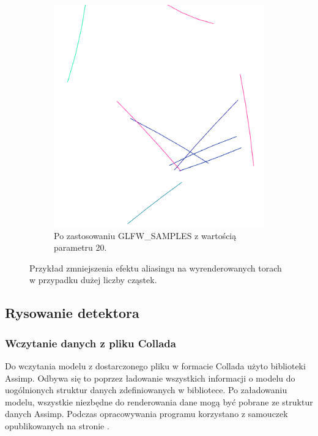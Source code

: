 \begin{figure}[H]
\begin{subfigure}{0.5\textwidth}
		\includegraphics[width=\textwidth]{Wart20.png}
    	\caption{Po zastosowaniu GLFW\_SAMPLES z wartością parametru 20.}
		\label{rys16}
	\end{subfigure}
    \caption{Przykład zmniejszenia efektu aliasingu na wyrenderowanych torach w przypadku dużej liczby cząstek.}
    \label{rys17}
\end{figure}


\newpage
\subsection{Rysowanie detektora}
\subsubsection{Wczytanie danych z pliku Collada}
Do wczytania modelu z dostarczonego pliku w formacie Collada użyto biblioteki Assimp. Odbywa się to poprzez ładowanie wszystkich informacji o modelu do uogólnionych struktur danych zdefiniowanych w bibliotece. Po załadowaniu modelu, wszystkie niezbędne do renderowania dane mogą być pobrane ze struktur danych Assimp. Podczas opracowywania programu korzystano z samouczek opublikowanych na stronie \cite{learnopengl}. 

